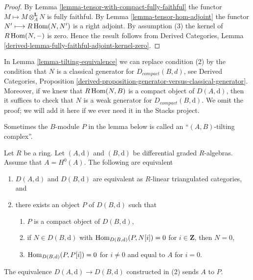 \begin{proof}
By Lemma \ref{lemma-tensor-with-compact-fully-faithful}
the functor $M \longmapsto M \otimes_A^\mathbf{L} N$ is
fully faithful. By Lemma \ref{lemma-tensor-hom-adjoint}
the functor $N' \longmapsto R\mathop{\mathrm{Hom}}\nolimits(N, N')$ is a right adjoint.
By assumption (3) the kernel of $R\mathop{\mathrm{Hom}}\nolimits(N, -)$ is zero.
Hence the result follows from
Derived Categories, Lemma
\ref{derived-lemma-fully-faithful-adjoint-kernel-zero}.
\end{proof}

\begin{remark}
\label{remark-tilting-equivalence}
In Lemma \ref{lemma-tilting-equivalence} we can replace
condition (2) by the condition that $N$ is a classical
generator for $D_{compact}(B, d)$, see
Derived Categories, Proposition
\ref{derived-proposition-generator-versus-classical-generator}.
Moreover, if we knew that $R\mathop{\mathrm{Hom}}\nolimits(N, B)$ is a compact object
of $D(A, \text{d})$, then it suffices to check that $N$
is a weak generator for $D_{compact}(B, \text{d})$.
We omit the proof; we will add it here if we ever
need it in the Stacks project.
\end{remark}

\noindent
Sometimes the $B$-module $P$ in the lemma below is called an
``$(A, B)$-tilting complex''.

\begin{lemma}
\label{lemma-rickard}
Let $R$ be a ring. Let $(A, \text{d})$ and $(B, \text{d})$ be
differential graded $R$-algebras. Assume that $A = H^0(A)$.
The following are equivalent
\begin{enumerate}
\item $D(A, \text{d})$ and $D(B, \text{d})$ are equivalent as $R$-linear
triangulated categories, and
\item there exists an object $P$ of $D(B, \text{d})$ such that
\begin{enumerate}
\item $P$ is a compact object of $D(B, \text{d})$,
\item if $N \in D(B, \text{d})$ with $\mathop{\mathrm{Hom}}\nolimits_{D(B, \text{d})}(P, N[i]) = 0$
for $i \in \mathbf{Z}$, then $N = 0$,
\item $\mathop{\mathrm{Hom}}\nolimits_{D(B, \text{d})}(P, P[i]) = 0$ for $i \not = 0$ and
equal to $A$ for $i = 0$.
\end{enumerate}
\end{enumerate}
The equivalence $D(A, \text{d}) \to D(B, \text{d})$
constructed in (2) sends $A$ to $P$.
\end{lemma}

